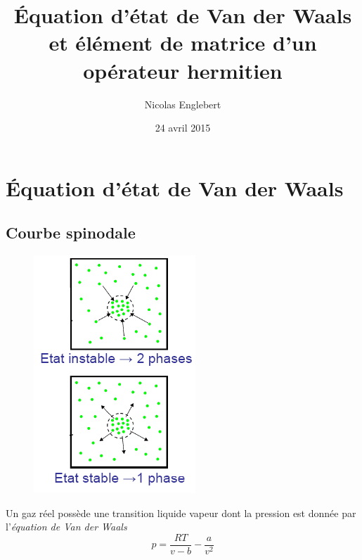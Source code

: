 \documentclass{article}
\title{Équation d'état de Van der Waals et élément de matrice d'un 
opérateur hermitien}
\author{Nicolas Englebert}
\date{24 avril 2015}
\begin{document}
\section{Équation d'état de Van der Waals}
\subsection{Courbe spinodale}
	\begin{figure}
		\includegraphics[scale=0.37]{images/image8.png}
	\end{figure}
	Un gaz réel possède une transition liquide vapeur dont la pression est donnée par l'\textit{équation de Van der Waals}
	\begin{equation}
	p = \frac{RT}{v-b}-\frac{a}{v^2}
	\end{equation}
	
\end{document}
